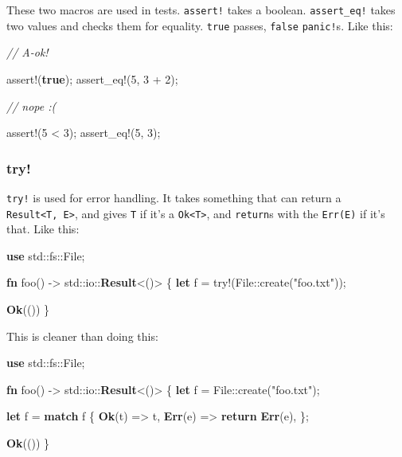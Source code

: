 \documentclass[a4paper,]{book}
\newenvironment{Shaded}{\begin{snugshade}}{\end{snugshade}}
\newcommand{\KeywordTok}[1]{\textcolor[rgb]{0.13,0.29,0.53}{\textbf{{#1}}}}
\newcommand{\DecValTok}[1]{\textcolor[rgb]{0.00,0.00,0.81}{{#1}}}
\newcommand{\StringTok}[1]{\textcolor[rgb]{0.31,0.60,0.02}{{#1}}}
\newcommand{\CommentTok}[1]{\textcolor[rgb]{0.56,0.35,0.01}{\textit{{#1}}}}
\newcommand{\OtherTok}[1]{\textcolor[rgb]{0.56,0.35,0.01}{{#1}}}
\newcommand{\NormalTok}[1]{{#1}}
\begin{document}
These two macros are used in tests. \texttt{assert!} takes a boolean.
\texttt{assert\_eq!} takes two values and checks them for equality.
\texttt{true} passes, \texttt{false} \texttt{panic!}s. Like this:

\begin{Shaded}
\begin{Highlighting}[]
\CommentTok{// A-ok!}

\OtherTok{assert!}\NormalTok{(}\KeywordTok{true}\NormalTok{);}
\OtherTok{assert_eq!}\NormalTok{(}\DecValTok{5}\NormalTok{, }\DecValTok{3} \NormalTok{+ }\DecValTok{2}\NormalTok{);}

\CommentTok{// nope :(}

\OtherTok{assert!}\NormalTok{(}\DecValTok{5} \NormalTok{< }\DecValTok{3}\NormalTok{);}
\OtherTok{assert_eq!}\NormalTok{(}\DecValTok{5}\NormalTok{, }\DecValTok{3}\NormalTok{);}
\end{Highlighting}
\end{Shaded}

\subsubsection{try!}\label{try}

\texttt{try!} is used for error handling. It takes something that can
return a \texttt{Result\textless{}T,\ E\textgreater{}}, and gives
\texttt{T} if it's a \texttt{Ok\textless{}T\textgreater{}}, and
\texttt{return}s with the \texttt{Err(E)} if it's that. Like this:

\begin{Shaded}
\begin{Highlighting}[]
\KeywordTok{use} \NormalTok{std::fs::File;}

\KeywordTok{fn} \NormalTok{foo() -> std::io::}\KeywordTok{Result}\NormalTok{<()> \{}
    \KeywordTok{let} \NormalTok{f = }\OtherTok{try!}\NormalTok{(File::create(}\StringTok{"foo.txt"}\NormalTok{));}

    \KeywordTok{Ok}\NormalTok{(())}
\NormalTok{\}}
\end{Highlighting}
\end{Shaded}

This is cleaner than doing this:

\begin{Shaded}
\begin{Highlighting}[]
\KeywordTok{use} \NormalTok{std::fs::File;}

\KeywordTok{fn} \NormalTok{foo() -> std::io::}\KeywordTok{Result}\NormalTok{<()> \{}
    \KeywordTok{let} \NormalTok{f = File::create(}\StringTok{"foo.txt"}\NormalTok{);}

    \KeywordTok{let} \NormalTok{f = }\KeywordTok{match} \NormalTok{f \{}
        \KeywordTok{Ok}\NormalTok{(t) => t,}
        \KeywordTok{Err}\NormalTok{(e) => }\KeywordTok{return} \KeywordTok{Err}\NormalTok{(e),}
    \NormalTok{\};}

    \KeywordTok{Ok}\NormalTok{(())}
\NormalTok{\}}
\end{Highlighting}
\end{Shaded}
\end{document}
